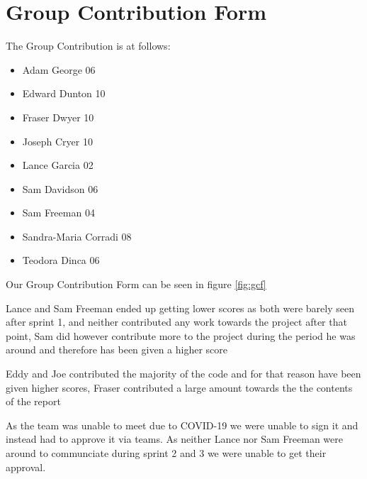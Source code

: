 \documentclass[10pt]{report}
\begin{document}
\section{Group Contribution Form}

The Group Contribution is at follows:
\begin{itemize}
\item Adam George			06
\item Edward Dunton		10
\item Fraser Dwyer			10
\item Joseph Cryer			10
\item Lance Garcia			02
\item Sam Davidson			06
\item Sam Freeman 			04
\item Sandra-Maria Corradi	08
\item Teodora Dinca    		06
\end{itemize}

Our Group Contribution Form can be seen in figure \ref{fig:gcf}

Lance and Sam Freeman ended up getting lower scores as both were barely seen after sprint 1, and neither contributed any work towards the project after that point, Sam did however contribute more to the project during the period he was around and therefore has been given a higher score

Eddy and Joe contributed the majority of the code and for that reason have been given higher scores, Fraser contributed a large amount towards the the contents of the report

As the team was unable to meet due to COVID-19 we were unable to sign it and instead had to approve it via teams. As neither Lance nor Sam Freeman were around to communciate during sprint 2 and 3 we were unable to get their approval.

\newpage
\end{document}
